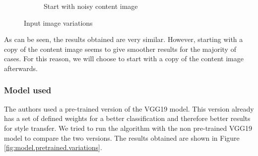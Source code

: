 \documentclass[twocolumn,superscriptaddress,aps, floatfix]{revtex4-1}
\begin{document}
\begin{figure}[ht]
\begin{subfigure}[b]{0.22\textwidth}
            \caption{Start with noisy content image}
        \end{subfigure}
        \caption{Input image variations}
        \label{fig:input.image.variations}
    \end{figure}
    
    As can be seen, the results obtained are very similar. However, starting with a copy of the content image seems to give smoother results for the majority of cases. For this reason, we will choose to start with a copy of the content image afterwards.
    
    \subsubsection{Model used}
    
    The authors used a pre-trained version of the VGG19 model. This version already has a set of defined weights for a better classification and therefore better results for style transfer. We tried to run the algorithm with the non pre-trained VGG19 model to compare the two versions. The results obtained are shown in Figure \ref{fig:model.pretrained.variations}.
    
\end{document}
